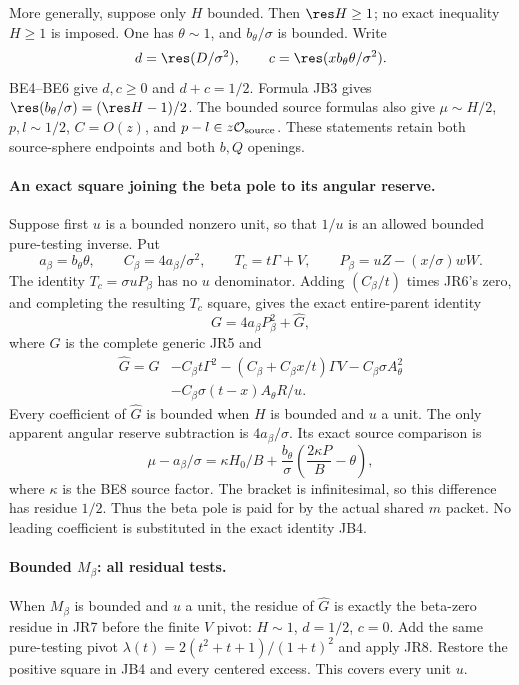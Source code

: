 More generally, suppose only $H$ bounded. Then $\res H\ge1$;
no exact inequality $H\ge1$ is imposed. One has $\theta\sim1$,
and $b_\theta/\sigma$ is bounded. Write
\[
 d=\res(D/\sigma^2),\qquad
 c=\res(xb_\theta\theta/\sigma^2).
\]
BE4--BE6 give $d,c\ge0$ and $d+c=1/2$. Formula JB3 gives
$\res(b_\theta/\sigma)=(\res H-1)/2$. The bounded source formulas
also give $\mu\sim H/2$, $p,l\sim1/2$, $C=O(z)$, and
$p-l\in z\mathcal O_{\rm source}$. These statements retain both
source-sphere endpoints and both $b,Q$ openings.

\paragraph{An exact square joining the beta pole to its angular reserve.}
Suppose first $u$ is a bounded nonzero unit, so that $1/u$ is an
allowed bounded pure-testing inverse. Put
\[
 a_\beta=b_\theta\theta,\qquad
 C_\beta=4a_\beta/\sigma^2,\qquad T_c=t\Gamma+V,
 \qquad P_\beta=uZ-(x/\sigma)wW.
\]
The identity $T_c=\sigma uP_\beta$ has no $u$ denominator.
Adding $(C_\beta/t)$ times JR6's zero, and completing the resulting
$T_c$ square, gives the exact entire-parent identity
\[
 G=4a_\beta P_\beta^2+\widehat G,
\tag{JB4}
\]
where $G$ is the complete generic JR5 and
\begin{align*}
 \widehat G=G
 &-C_\beta t\Gamma^2
 -(C_\beta+C_\beta x/t)\Gamma V
 -C_\beta\sigma A_\theta^2\\
 &-C_\beta\sigma(t-x)A_\theta R/u.
\tag{JB5}
\end{align*}
Every coefficient of $\widehat G$ is bounded when $H$ is bounded
and $u$ a unit. The only apparent angular reserve subtraction is
$4a_\beta/\sigma$. Its exact source comparison is
\[
 \mu-a_\beta/\sigma
 =\kappa H_0/B+
    \frac{b_\theta}{\sigma}\left(\frac{2\kappa P}{B}-\theta\right),
\tag{JB6}
\]
where $\kappa$ is the BE8 source factor. The bracket is infinitesimal,
so this difference has residue $1/2$. Thus the beta pole is paid for
by the actual shared $m$ packet. No leading coefficient is substituted
in the exact identity JB4.

\paragraph{Bounded $M_\beta$: all residual tests.}
When $M_\beta$ is bounded and $u$ a unit, the residue of $\widehat G$
is exactly the beta-zero residue in JR7 before the finite $V$ pivot:
$H\sim1$, $d=1/2$, $c=0$. Add the same pure-testing pivot
$\lambda(t)=2(t^2+t+1)/(1+t)^2$ and apply JR8. Restore the positive
square in JB4 and every centered excess. This covers every unit $u$.


